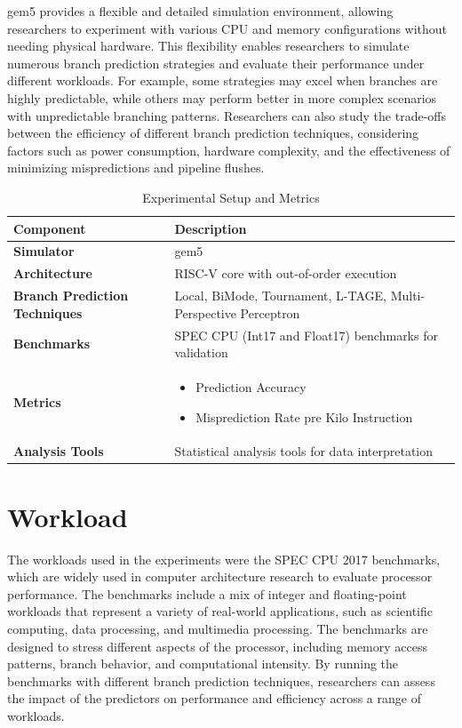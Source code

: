 \documentclass[10pt,journal,compsoc]{IEEEtran}
\begin{document}
gem5 provides a flexible and detailed simulation environment, allowing researchers to experiment with various CPU and memory configurations without needing physical hardware. This flexibility enables researchers to simulate numerous branch prediction strategies and evaluate their performance under different workloads. For example, some strategies may excel when branches are highly predictable, while others may perform better in more complex scenarios with unpredictable branching patterns. Researchers can also study the trade-offs between the efficiency of different branch prediction techniques, considering factors such as power consumption, hardware complexity, and the effectiveness of minimizing mispredictions and pipeline flushes.
\begin{table}[h]
    \centering
    \caption{Experimental Setup and Metrics}
    \begin{tabular}{| >{\centering\arraybackslash}m{2cm}| >{\centering\arraybackslash}m{4cm}|}
        \hline
        \textbf{Component} & \textbf{Description} \\
        \hline
        \textbf{Simulator} & gem5 \\
        \hline
        \textbf{Architecture} & RISC-V core with out-of-order execution \\
        \hline
        \textbf{Branch Prediction Techniques} & Local, BiMode, Tournament, L-TAGE, Multi-Perspective Perceptron \\
        \hline
        \textbf{Benchmarks} & SPEC CPU (Int17 and Float17) benchmarks for validation \\
        \hline
        \textbf{Metrics} & \begin{itemize}
            \item Prediction Accuracy
            \item Misprediction Rate pre Kilo Instruction
            \end{itemize} \\
        \hline
        \textbf{Analysis Tools} & Statistical analysis tools for data interpretation \\
        \hline
    \end{tabular}
\end{table}


\section{Workload}\label{workload}
\noindent The workloads used in the experiments were the SPEC CPU 2017 benchmarks, which are widely used in computer architecture research to evaluate processor performance. The benchmarks include a mix of integer and floating-point workloads that represent a variety of real-world applications, such as scientific computing, data processing, and multimedia processing. The benchmarks are designed to stress different aspects of the processor, including memory access patterns, branch behavior, and computational intensity. By running the benchmarks with different branch prediction techniques, researchers can assess the impact of the predictors on performance and efficiency across a range of workloads.
\end{document}

